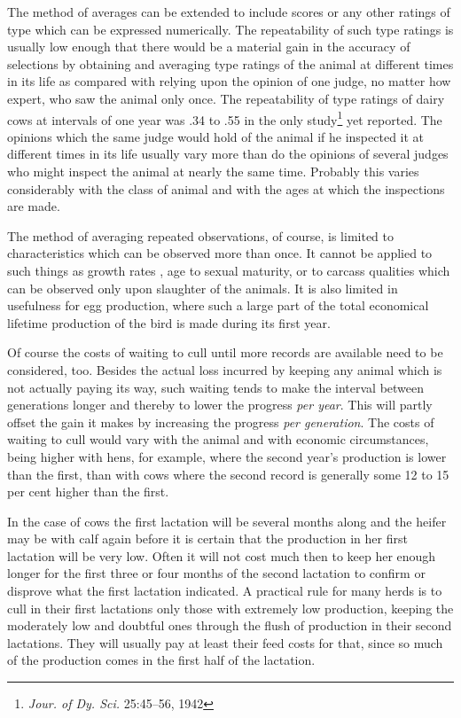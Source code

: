The method of averages can be extended to include scores or any
other ratings of type which can be expressed numerically. The repeatability
of such type ratings is usually low enough that there would be
a material gain in the accuracy of selections by obtaining and averaging
type ratings of the animal at different times in its life as compared with
relying upon the opinion of one judge, no matter how expert, who saw
the animal only once. The repeatability of type ratings of dairy cows at
intervals of one year was .34 to .55 in the only study\footnote{\textit{Jour.
of Dy. Sci.} 25:45--56, 1942} yet reported. The
opinions which the same judge would hold of the animal if he inspected
it at different times in its life usually vary more than do the opinions of
several judges who might inspect the animal at nearly the same time.
Probably this varies considerably with the class of animal and with the
ages at which the inspections are made.

The method of averaging repeated observations, of course, is limited
to characteristics which can be observed more than once. It cannot be
applied to such things as growth rates , age to sexual maturity, or to
carcass qualities which can be observed only upon slaughter of the
animals. It is also limited in usefulness for egg production, where such
a large part of the total economical lifetime production of the bird is
made during its first year.

Of course the costs of waiting to cull until more records are available
need to be considered, too. Besides the actual loss incurred by
keeping any animal which is not actually paying its way, such waiting
tends to make the interval between generations longer and thereby to
lower the progress \textit{per year}. This will partly offset the gain it makes by
increasing the progress \textit{per generation}. The costs of waiting to cull
would vary with the animal and with economic circumstances, being
higher with hens, for example, where the second year's production is
lower than the first, than with cows where the second record is generally
some 12 to 15 per cent higher than the first.

In the case of cows the first lactation will be several months along
and the heifer may be with calf again before it is certain that the production
in her first lactation will be very low. Often it will not cost
much then to keep her enough longer for the first three or four months
of the second lactation to confirm or disprove what the first lactation
indicated. A practical rule for many herds is to cull in their first lactations
only those with extremely low production, keeping the moderately
low and doubtful ones through the flush of production in their second
lactations. They will usually pay at least their feed costs for that,
since so much of the production comes in the first half of the lactation.

